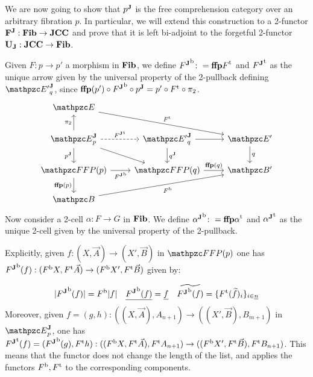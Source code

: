 \documentclass{lmcs} %
\theoremstyle{plain}\newtheorem{satz}[thm]{Satz} %
\begin{document}
			We are now going to show that ${p}^{\mathbf{J}}$ is the free comprehension category over an arbitrary fibration $p$. In particular, we will extend this construction to a 2-functor $\mathbf{F^J}:\mathbf{Fib}\to\mathbf{JCC}$ and prove that it is left bi-adjoint to the forgetful 2-functor $\mathbf{U_J}:\mathbf{JCC}\to\mathbf{Fib}$.
			
			Given $F:p\to p'$ a morphism in $\mathbf{Fib}$, we define ${{F}^{\mathbf{J}}}^{\mathrm{b}}\colon ={\mathbf{ffp}{F}}^{\mathrm{t}}$ and ${{F}^{\mathbf{J}}}^{\mathrm{t}}$ as the unique arrow given by the universal property of the 2-pullback defining $\JDom{\ct{E}'}{q}$, since $\mathbf{ffp}(p')\circ{\ensuremath{{F}^{\mathbf{J}}}}^{\mathrm{b}}\circ{p}^{\mathbf{J}}=p'\circ {F}^{\mathrm{t}}\circ\pi_2$.
			\[\begin{tikzcd}
				{\ct{E}} \\
				{\JDomE{p}} & {\JDom{\ct{E}'}{q}} & {\ct{E}'} \\
				{\FFFP{p}} & {\FFFP{q}} & {\ct{B'}} \\
				{\ct{B}}
				\arrow["\ft{F}", from=1-1, to=2-3]
				\arrow["\pi_2", from=2-1, to=1-1]
				\arrow["{\ft{\JFun{F}}}", dashed, from=2-1, to=2-2]
				\arrow["{\JFib{p}}"', from=2-1, to=3-1]
				\arrow[from=2-1, to=3-2]
				\arrow[from=2-2, to=2-3]
				\arrow["{\JFib{q}}", from=2-2, to=3-2]
				\arrow["q", from=2-3, to=3-3]
				\arrow["{\fb{\JFun{F}}}"', from=3-1, to=3-2]
				\arrow["{\fffp{p}}"', from=3-1, to=4-1]
				\arrow["{\fffp{q}}", from=3-2, to=3-3]
				\arrow["\fb{F}"', from=4-1, to=3-3]
			\end{tikzcd}\]
			Now consider a 2-cell $\alpha:F\to G$ in $\mathbf{Fib}$. We define ${{\alpha}^{\mathbf{J}}}^{\mathrm{b}}\colon = {\mathbf{ffp}{\alpha}}^{\mathrm{t}}$ and ${{\alpha}^{\mathbf{J}}}^{\mathrm{t}}$ as the unique 2-cell given by the universal property of the 2-pullback. 

			Explicitly, given $f:(X,\vec{A})\rightarrow (X',\vec{B})$ in $\FFFP{p}$ one has ${{F}^{\mathbf{J}}}^{\mathrm{b}}(f):({F}^{\mathrm{b}}X,{F}^{\mathrm{t}}\vec{A})\rightarrow ({F}^{\mathrm{b}}X',{F}^{\mathrm{t}}\vec{B})$ given by:
			
			\begin{align*}
				|{{F}^{\mathbf{J}}}^{\mathrm{b}}(f)| = {F}^{\mathrm{b}}|f| &&
				\underline{{{F}^{\mathbf{J}}}^{\mathrm{b}}(f)} = \underline{f} &&
				\widetilde{{{F}^{\mathbf{J}}}^{\mathrm{b}}(f)} = \{{F}^{\mathrm{t}}(\widetilde{f})_i\}_{i\in\underline{n}}
			\end{align*}		
			Moreover, given $f=(g,h):((X,\vec{A}), A_{n+1})\rightarrow ((X',\vec{B}), B_{m+1})$ in $\JDomE{p}$, one has ${{F}^{\mathbf{J}}}^{\mathrm{t}}(f)=({{F}^{\mathbf{J}}}^{\mathrm{b}}(g), {F}^{\mathrm{t}}h):(({F}^{\mathrm{b}}X,{F}^{\mathrm{t}}\vec{A}), {F}^{\mathrm{t}}A_{n+1})\rightarrow (({F}^{\mathrm{b}}X',{F}^{\mathrm{t}}\vec{B}), {F}^{\mathrm{t}}B_{n+1})$. This means that the functor does not change the length of the list, and applies the functors ${F}^{\mathrm{b}},{F}^{\mathrm{t}}$ to the corresponding components.
\end{document}
